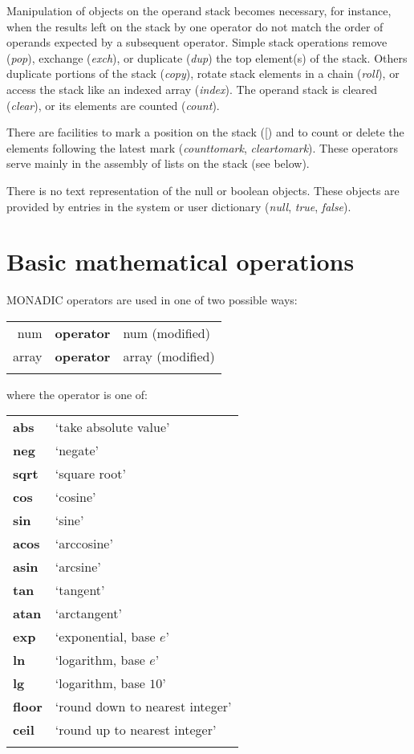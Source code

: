 Manipulation of objects on the operand stack becomes necessary,  for  instance, when  the  results  left on the stack by one operator  do  not  match  the 
order of operands expected by a subsequent operator.  Simple  stack  operations remove (\emph{pop}),  exchange (\emph{exch}), or duplicate (\emph{dup}) the top element(s) of the stack.  Others  duplicate  portions  of the  stack  (\emph{copy}),  rotate  stack elements  in a chain (\emph{roll}),  or access the stack like an indexed  array (\emph{index}). The operand stack is cleared (\emph{clear}), or its elements are counted (\emph{count}).

There are facilities to mark a position on the stack ([) and to count  or delete the elements following the latest mark (\emph{counttomark},  \emph{cleartomark}). These  operators serve mainly in the assembly of lists on the  stack  (see below).

There  is no text representation of the null or  boolean  objects. These objects are provided by entries in the system or user dictionary (\emph{null}, \emph{true}, \emph{false}). 

\section{Basic mathematical operations}

MONADIC operators are used in one of two possible ways:
\nopagebreak \\

\begin{tabular}{>{\sffamily}r>{\sffamily\bfseries}l>{\sffamily}l} 
num & operator & num (modified)\\
array & operator & array (modified)\\\\
\end{tabular}

\noindent where the operator is one of:
\nopagebreak \\

\begin{tabular}{>{\sffamily\bfseries}l>{\normalfont}l}
abs   & `take absolute value'\\
neg   & `negate'\\
sqrt  & `square root'\\
cos   & `cosine'\\
sin   & `sine'\\
acos  & `arccosine'\\
asin  & `arcsine'\\
tan   & `tangent'\\
atan  & `arctangent'\\
exp   & `exponential, base $e$'\\
ln    & `logarithm, base $e$'\\
lg    & `logarithm, base $10$'\\
floor & `round down to nearest integer'\\
ceil  & `round up to nearest integer'\\\\
\end{tabular}

